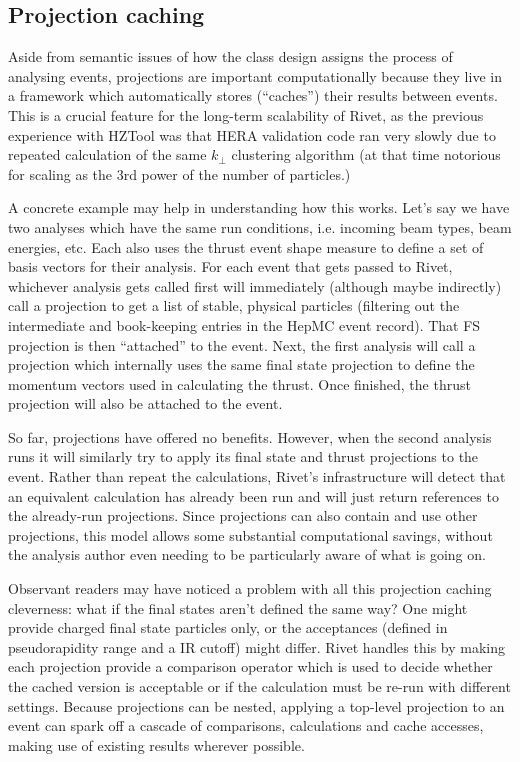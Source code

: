 \documentclass{JHEP3}
\begin{document}
\subsection{Projection caching}

Aside from semantic issues of how the class design assigns the process of
analysing events, projections are important computationally because they live in
a framework which automatically stores (``caches'') their results between
events. This is a crucial feature for the long-term scalability of Rivet, as the
previous experience with HZTool was that HERA validation code ran very slowly
due to repeated calculation of the same $k_\perp$ clustering algorithm (at that
time notorious for scaling as the 3rd power of the number of particles.)

A concrete example may help in understanding how this works. Let's say we have
two analyses which have the same run conditions, i.e. incoming beam types, beam
energies, etc. Each also uses the thrust event shape measure to define a set of
basis vectors for their analysis. For each event that gets passed to Rivet,
whichever analysis gets called first will immediately (although maybe
indirectly) call a  projection to get a list of stable, physical
particles (filtering out the intermediate and book-keeping entries in the HepMC
event record). That FS projection is then ``attached'' to the event. Next, the
first analysis will call a  projection which internally uses the
same final state projection to define the momentum vectors used in calculating
the thrust. Once finished, the thrust projection will also be attached to the
event.

So far, projections have offered no benefits. However, when the second analysis
runs it will similarly try to apply its final state and thrust projections to
the event. Rather than repeat the calculations, Rivet's infrastructure will
detect that an equivalent calculation has already been run and will just return
references to the already-run projections. Since projections can also contain
and use other projections, this model allows some substantial computational
savings, without the analysis author even needing to be particularly aware of
what is going on.

Observant readers may have noticed a problem with all this projection caching
cleverness: what if the final states aren't defined the same way? One might
provide charged final state particles only, or the acceptances (defined in
pseudorapidity range and a IR \pT cutoff) might differ. Rivet handles this by
making each projection provide a comparison operator which is used to decide
whether the cached version is acceptable or if the calculation must be re-run
with different settings. Because projections can be nested, applying a top-level
projection to an event can spark off a cascade of comparisons, calculations and
cache accesses, making use of existing results wherever possible.
\end{document}
